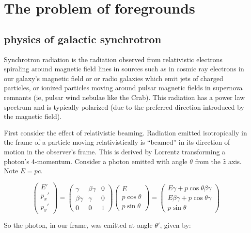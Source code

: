 \section{The problem of foregrounds}

\subsection{physics of galactic synchrotron}

Synchrotron radiation is the radiation observed from relativistic electrons spiraling around magnetic field lines in sources such as in cosmic ray electrons in our galaxy's magnetic field or  or radio galaxies which emit jets of charged particles, or ionized particles moving around pulsar magnetic fields in supernova remnants (ie, pulsar wind nebulae like the Crab). This radiation has a power law spectrum and is typically polarized (due to the preferred direction introduced by the magnetic field). 

First consider the effect of relativistic beaming. Radiation emitted isotropically in the frame of a particle moving relativistically is ``beamed'' in its direction of motion in the observer's frame. This is derived by Lorrentz transforming a photon's 4-momentum. Consider a photon emitted with angle $\theta$ from the $\hat{z}$ axis. Note $E=pc$.

\begin{equation}
\left(\begin{matrix}
E'\\
p_x'\\
p_y'
\end{matrix}\right)=
\left(\begin{matrix}
\gamma&\beta\gamma& 0\\
\beta\gamma&\gamma &0\\
0&0 &1
\end{matrix}\right)
\left(\begin{matrix}
E\\
p\cos\theta\\
p\sin\theta
\end{matrix}\right)=
\left(\begin{matrix}
E\gamma+p\cos\theta\beta\gamma\\
E\beta\gamma+p\cos\theta\gamma\\
p\sin\theta
\end{matrix}\right)
\end{equation}

So the photon, in our frame, was emitted at angle $\theta'$, given by:

